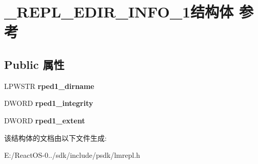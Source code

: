 \hypertarget{struct___r_e_p_l___e_d_i_r___i_n_f_o__1}{}\section{\+\_\+\+R\+E\+P\+L\+\_\+\+E\+D\+I\+R\+\_\+\+I\+N\+F\+O\+\_\+1结构体 参考}
\label{struct___r_e_p_l___e_d_i_r___i_n_f_o__1}
\subsection*{Public 属性}
\begin{DoxyCompactItemize}
\item 
\mbox{\label{struct___r_e_p_l___e_d_i_r___i_n_f_o__1_abc7cbb6d59f8b7cbfcf8b0474f2c57fc}} 
L\+P\+W\+S\+TR {\bfseries rped1\+\_\+dirname}
\item 
\mbox{\label{struct___r_e_p_l___e_d_i_r___i_n_f_o__1_af7a089211b872a8e1f3ca11d5cf13924}} 
D\+W\+O\+RD {\bfseries rped1\+\_\+integrity}
\item 
\mbox{\label{struct___r_e_p_l___e_d_i_r___i_n_f_o__1_a0327197d1cca0e48addf7d7f571653ea}} 
D\+W\+O\+RD {\bfseries rped1\+\_\+extent}
\end{DoxyCompactItemize}


该结构体的文档由以下文件生成\+:\begin{DoxyCompactItemize}
\item 
E\+:/\+React\+O\+S-\/0../sdk/include/psdk/lmrepl.\+h\end{DoxyCompactItemize}
